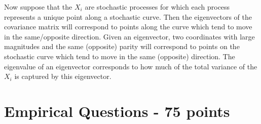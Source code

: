 \documentclass{article}
\begin{document}
\begin{enumerate}
		Now suppose that the $X_i$ are stochastic processes for which each process represents a unique point along a stochastic curve. Then the eigenvectors of the covariance matrix will correspond to points along the curve which tend to move in the same/opposite direction. Given an eigenvector, two coordinates with large magnitudes and the same (opposite) parity will correspond to points on the stochastic curve which tend to move in the same (opposite) direction. The eigenvalue of an eigenvector corresponds to how much of the total variance of the $X_i$ is captured by this eigenvector. 
		
		
		
	\end{enumerate}
	
	
	
	\section*{Empirical Questions - 75 points} 
	
\end{document}
